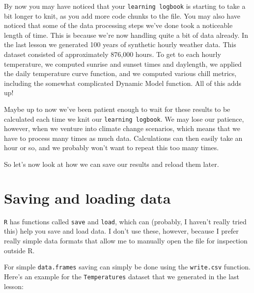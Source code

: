 \documentclass[
]{book}
\newenvironment{Shaded}{\begin{snugshade}}{\end{snugshade}}
\newcommand{\DataTypeTok}[1]{\textcolor[rgb]{0.13,0.29,0.53}{#1}}
\newcommand{\DecValTok}[1]{\textcolor[rgb]{0.00,0.00,0.81}{#1}}
\newcommand{\KeywordTok}[1]{\textcolor[rgb]{0.13,0.29,0.53}{\textbf{#1}}}
\newcommand{\NormalTok}[1]{#1}
\newcommand{\OperatorTok}[1]{\textcolor[rgb]{0.81,0.36,0.00}{\textbf{#1}}}
\newcommand{\StringTok}[1]{\textcolor[rgb]{0.31,0.60,0.02}{#1}}
\begin{document}
By now you may have noticed that your \texttt{learning\ logbook} is starting to take a bit longer to knit, as you add more code chunks to the file. You may also have noticed that some of the data processing steps we've done took a noticeable length of time. This is because we're now handling quite a bit of data already. In the last lesson we generated 100 years of synthetic hourly weather data. This dataset consisted of approximately 876,000 hours. To get to each hourly temperature, we computed sunrise and sunset times and daylength, we applied the daily temperature curve function, and we computed various chill metrics, including the somewhat complicated Dynamic Model function. All of this adds up!

Maybe up to now we've been patient enough to wait for these results to be calculated each time we knit our \texttt{learning\ logbook}. We may lose our patience, however, when we venture into climate change scenarios, which means that we have to process many times as much data. Calculations can then easily take an hour or so, and we probably won't want to repeat this too many times.

So let's now look at how we can save our results and reload them later.

\hypertarget{saving-and-loading-data}{%
\section{Saving and loading data}\label{saving-and-loading-data}}

\texttt{R} has functions called \texttt{save} and \texttt{load}, which can (probably, I haven't really tried this) help you save and load data. I don't use these, however, because I prefer really simple data formats that allow me to manually open the file for inspection outside R.

For simple \texttt{data.frames} saving can simply be done using the \texttt{write.csv} function. Here's an example for the \texttt{Temperatures} dataset that we generated in the last lesson:

\begin{Shaded}
\end{Shaded}
\end{document}
